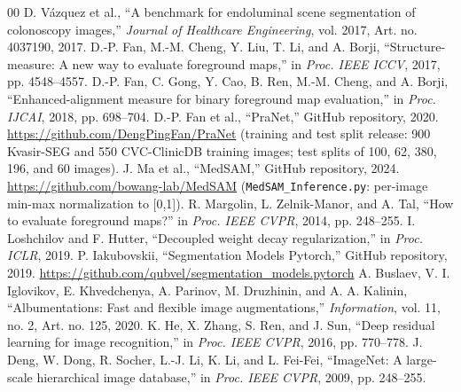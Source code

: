 \documentclass[conference]{IEEEtran}
\begin{document}
\begin{thebibliography}{00}
 D. V\'azquez et al., ``A benchmark for endoluminal scene segmentation of colonoscopy images,'' \textit{Journal of Healthcare Engineering}, vol. 2017, Art. no. 4037190, 2017.
 D.-P. Fan, M.-M. Cheng, Y. Liu, T. Li, and A. Borji, ``Structure-measure: A new way to evaluate foreground maps,'' in \textit{Proc. IEEE ICCV}, 2017, pp. 4548--4557.
 D.-P. Fan, C. Gong, Y. Cao, B. Ren, M.-M. Cheng, and A. Borji, ``Enhanced-alignment measure for binary foreground map evaluation,'' in \textit{Proc. IJCAI}, 2018, pp. 698--704.
 D.-P. Fan et al., ``PraNet,'' GitHub repository, 2020. \url{https://github.com/DengPingFan/PraNet} (training and test split release: 900 Kvasir-SEG and 550 CVC-ClinicDB training images; test splits of 100, 62, 380, 196, and 60 images).
 J. Ma et al., ``MedSAM,'' GitHub repository, 2024. \url{https://github.com/bowang-lab/MedSAM} (\texttt{MedSAM\_Inference.py}: per-image min-max normalization to [0,1]).
 R. Margolin, L. Zelnik-Manor, and A. Tal, ``How to evaluate foreground maps?'' in \textit{Proc. IEEE CVPR}, 2014, pp. 248--255.
 I. Loshchilov and F. Hutter, ``Decoupled weight decay regularization,'' in \textit{Proc. ICLR}, 2019.
 P. Iakubovskii, ``Segmentation Models Pytorch,'' GitHub repository, 2019. \url{https://github.com/qubvel/segmentation_models.pytorch}
 A. Buslaev, V. I. Iglovikov, E. Khvedchenya, A. Parinov, M. Druzhinin, and A. A. Kalinin, ``Albumentations: Fast and flexible image augmentations,'' \textit{Information}, vol. 11, no. 2, Art. no. 125, 2020.
 K. He, X. Zhang, S. Ren, and J. Sun, ``Deep residual learning for image recognition,'' in \textit{Proc. IEEE CVPR}, 2016, pp. 770--778.
 J. Deng, W. Dong, R. Socher, L.-J. Li, K. Li, and L. Fei-Fei, ``ImageNet: A large-scale hierarchical image database,'' in \textit{Proc. IEEE CVPR}, 2009, pp. 248--255.
\end{thebibliography}
\end{document}
